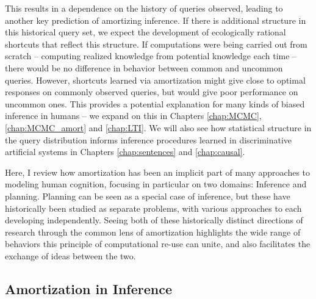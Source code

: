 This results in a dependence on the history of queries observed, leading to another key prediction of amortizing inference. If there is additional structure in this historical query set, we expect the development of ecologically rational shortcuts that reflect this structure. If computations were being carried out from scratch -- computing realized knowledge from potential knowledge each time -- there would be no difference in behavior between common and uncommon queries. However, shortcuts learned via amortization might give close to optimal responses on commonly observed queries, but would give poor performance on uncommon ones. This provides a potential explanation for many kinds of biased inference in humans -- we expand on this in Chapters \ref{chap:MCMC}, \ref{chap:MCMC_amort} and \ref{chap:LTI}. We will also see how statistical structure in the query distribution informs inference procedures learned in discriminative artificial systems in Chapters \ref{chap:sentences} and \ref{chap:causal}. 

Here, I review how amortization has been an implicit part of many approaches to modeling human cognition, focusing in particular on two domains: Inference and planning. Planning can be seen as a special case of inference\citep{botvinick2012planning}, but these have historically been studied as separate problems, with various approaches to each developing independently. Seeing both of these historically distinct directions of research through the common lens of amortization highlights the wide range of behaviors this principle of computational re-use can unite, and also facilitates the exchange of ideas between the two. %

\subsection{Amortization in Inference}


